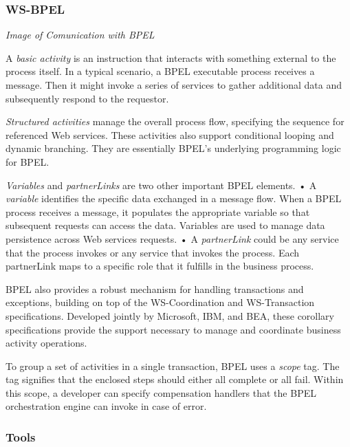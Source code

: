 \documentclass[12pt,a4paper]{article}
\begin{document}
\subsubsection{WS-BPEL}

\begin{center}
  \emph{Image of Comunication with BPEL}
\end{center}

A \emph{basic activity} is an instruction that interacts with something external to the process itself. In a typical scenario, a BPEL executable process receives a message. Then it might invoke a series of services to gather additional data and subsequently respond to the requestor.

\emph{Structured activities} manage the overall process flow, specifying the sequence for referenced Web services. These activities also support conditional looping and dynamic branching. They are essentially BPEL’s underlying programming logic for BPEL. 

\emph{Variables} and \emph{partnerLinks} are two other important BPEL elements.
  • A \emph{variable} identifies the specific data exchanged in a message flow. When a BPEL process receives a message, it populates the appropriate variable so that subsequent requests can access the data. Variables are used to manage data persistence across Web services requests.
  • A \emph{partnerLink} could be any service that the process invokes or any service that invokes the process. Each partnerLink maps to a specific role that it fulfills in the business process.


BPEL also provides a robust mechanism for handling transactions and exceptions, building on top of the WS-Coordination and WS-Transaction specifications. Developed jointly by Microsoft, IBM, and BEA, these corollary specifications provide the support necessary to manage and coordinate business activity operations.

To group a set of activities in a single transaction, BPEL uses a \emph{scope} tag. The tag signifies that the enclosed steps should either all complete or all fail. Within this scope, a developer can specify compensation handlers that the BPEL orchestration engine can invoke in case of error.

\subsubsection{Tools}
\end{document}
